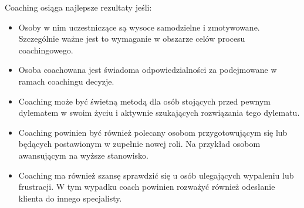 Coaching osiąga najlepsze rezultaty jeśli:
\begin{itemize}
  \item Osoby w nim uczestniczące są wysoce samodzielne i zmotywowane. Szczególnie ważne jest to wymaganie w obszarze celów procesu coachingowego.
  \item Osoba coachowana jest świadoma odpowiedzialności za podejmowane w ramach coachingu decyzje.
  \item Coaching może być świetną metodą dla osób stojących przed pewnym dylematem w swoim życiu i aktywnie szukających rozwiązania tego dylematu.
  \item Coaching powinien być również polecany osobom przygotowującym się lub będących postawionym w zupełnie nowej roli.
        Na przykład osobom awansującym na wyższe stanowisko.
  \item Coaching ma również szansę sprawdzić się u osób ulegających wypaleniu lub frustracji. W tym wypadku coach powinien rozważyć również odesłanie
        klienta do innego specjalisty.
\end{itemize}
